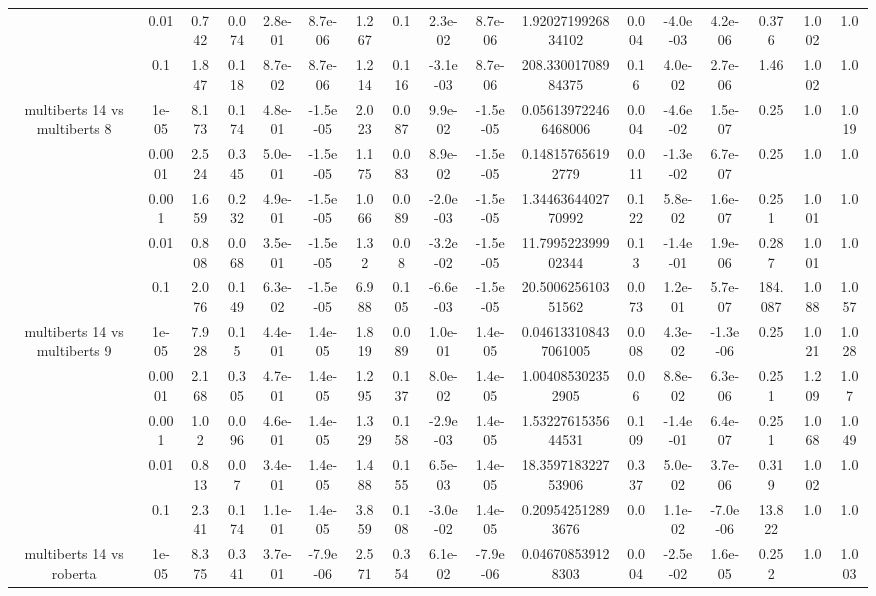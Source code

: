 \begin{tabular}{|c|c|c|c|c|c|c|c|c|c|c|c|c|c|c|c|c|}
 & 0.01 & 0.742 & 0.074 & 2.8e-01 & 8.7e-06 & 1.267 & 0.1 & 2.3e-02 & 8.7e-06 & 1.9202719926834102 & 0.004 & -4.0e-03 & 4.2e-06 & 0.376 & 1.002 & 1.0 \\
 & 0.1 & 1.847 & 0.118 & 8.7e-02 & 8.7e-06 & 1.214 & 0.116 & -3.1e-03 & 8.7e-06 & 208.33001708984375 & 0.16 & 4.0e-02 & 2.7e-06 & 1.46 & 1.002 & 1.0 \\
\hline
\multirow{5}{*}{multiberts 14 vs multiberts 8} & 1e-05 & 8.173 & 0.174 & 4.8e-01 & -1.5e-05 & 2.023 & 0.087 & 9.9e-02 & -1.5e-05 & 0.056139722466468006 & 0.004 & -4.6e-02 & 1.5e-07 & 0.25 & 1.0 & 1.019 \\
 & 0.0001 & 2.524 & 0.345 & 5.0e-01 & -1.5e-05 & 1.175 & 0.083 & 8.9e-02 & -1.5e-05 & 0.148157656192779 & 0.011 & -1.3e-02 & 6.7e-07 & 0.25 & 1.0 & 1.0 \\
 & 0.001 & 1.659 & 0.232 & 4.9e-01 & -1.5e-05 & 1.066 & 0.089 & -2.0e-03 & -1.5e-05 & 1.3446364402770992 & 0.122 & 5.8e-02 & 1.6e-07 & 0.251 & 1.001 & 1.0 \\
 & 0.01 & 0.808 & 0.068 & 3.5e-01 & -1.5e-05 & 1.32 & 0.08 & -3.2e-02 & -1.5e-05 & 11.799522399902344 & 0.13 & -1.4e-01 & 1.9e-06 & 0.287 & 1.001 & 1.0 \\
 & 0.1 & 2.076 & 0.149 & 6.3e-02 & -1.5e-05 & 6.988 & 0.105 & -6.6e-03 & -1.5e-05 & 20.500625610351562 & 0.073 & 1.2e-01 & 5.7e-07 & 184.087 & 1.088 & 1.057 \\
\hline
\multirow{5}{*}{multiberts 14 vs multiberts 9} & 1e-05 & 7.928 & 0.15 & 4.4e-01 & 1.4e-05 & 1.819 & 0.089 & 1.0e-01 & 1.4e-05 & 0.046133108437061005 & 0.008 & 4.3e-02 & -1.3e-06 & 0.25 & 1.021 & 1.028 \\
 & 0.0001 & 2.168 & 0.305 & 4.7e-01 & 1.4e-05 & 1.295 & 0.137 & 8.0e-02 & 1.4e-05 & 1.004085302352905 & 0.06 & 8.8e-02 & 6.3e-06 & 0.251 & 1.209 & 1.07 \\
 & 0.001 & 1.02 & 0.096 & 4.6e-01 & 1.4e-05 & 1.329 & 0.158 & -2.9e-03 & 1.4e-05 & 1.5322761535644531 & 0.109 & -1.4e-01 & 6.4e-07 & 0.251 & 1.068 & 1.049 \\
 & 0.01 & 0.813 & 0.07 & 3.4e-01 & 1.4e-05 & 1.488 & 0.155 & 6.5e-03 & 1.4e-05 & 18.359718322753906 & 0.337 & 5.0e-02 & 3.7e-06 & 0.319 & 1.002 & 1.0 \\
 & 0.1 & 2.341 & 0.174 & 1.1e-01 & 1.4e-05 & 3.859 & 0.108 & -3.0e-02 & 1.4e-05 & 0.209542512893676 & 0.0 & 1.1e-02 & -7.0e-06 & 13.822 & 1.0 & 1.0 \\
\hline
\multirow{5}{*}{multiberts 14 vs roberta } & 1e-05 & 8.375 & 0.341 & 3.7e-01 & -7.9e-06 & 2.571 & 0.354 & 6.1e-02 & -7.9e-06 & 0.046708539128303 & 0.004 & -2.5e-02 & 1.6e-05 & 0.252 & 1.0 & 1.003 \\

\end{tabular}
